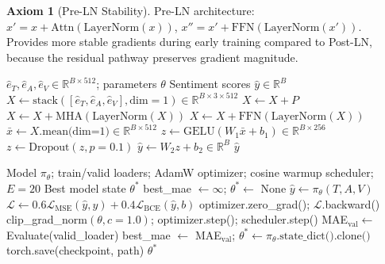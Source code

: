 \documentclass[12pt,a4paper]{article}
\theoremstyle{definition}
\newtheorem{axiom}{Axiom}[section]
\theoremstyle{plain}
\theoremstyle{remark}
\newcommand{\R}{\mathbb{R}}
\newcommand{\LN}{\mathrm{LayerNorm}}
\newcommand{\GELU}{\mathrm{GELU}}
\newcommand{\MHA}{\mathrm{MHA}}
\begin{document}
\begin{axiom}[Pre-LN Stability]
Pre-LN architecture: $x' = x + \text{Attn}(\LN(x))$, $x'' = x' + \text{FFN}(\LN(x'))$. Provides more stable gradients during early training compared to Post-LN, because the residual pathway preserves gradient magnitude.
\end{axiom}

\begin{algorithm}[H]
\caption{MultimodalFusionTransformer.forward}
\label{alg:fusion_forward}
\begin{algorithmic}[1]
\Require $\hat{e}_T, \hat{e}_A, \hat{e}_V \in \R^{B \times 512}$; parameters $\theta$
\Ensure Sentiment scores $\hat{y} \in \R^B$
\State $X \gets \text{stack}([\hat{e}_T, \hat{e}_A, \hat{e}_V], \text{dim}=1) \in \R^{B \times 3 \times 512}$
\State $X \gets X + P$ 
  \State $X \gets X + \MHA(\LN(X))$ 
  \State $X \gets X + \text{FFN}(\LN(X))$ 
\EndFor
\State $\bar{x} \gets X.\text{mean(dim=1)} \in \R^{B \times 512}$
\State $z \gets \GELU(W_1 \bar{x} + b_1) \in \R^{B \times 256}$
\State $z \gets \text{Dropout}(z, p=0.1)$
\State $\hat{y} \gets W_2 z + b_2 \in \R^B$
\State \Return $\hat{y}$
\end{algorithmic}
\end{algorithm}

\begin{algorithm}[H]
\caption{Full Training Loop --- Pipeline E (20 Epochs, Best-Model Tracking)}
\label{alg:training_e}
\begin{algorithmic}[1]
\Require Model $\pi_\theta$; train/valid loaders; AdamW optimizer; cosine warmup scheduler; $E=20$
\Ensure Best model state $\theta^*$
\State best\_mae $\gets \infty$; $\theta^* \gets$ None
    \State $\hat{y} \gets \pi_\theta(T, A, V)$
    \State $\mathcal{L} \gets 0.6\mathcal{L}_{\text{MSE}}(\hat{y},y) + 0.4\mathcal{L}_{\text{BCE}}(\hat{y},b)$
    \State optimizer.zero\_grad(); $\mathcal{L}$.backward()
    \State clip\_grad\_norm$(\theta, c=1.0)$; optimizer.step(); scheduler.step()
  \EndFor
  \State MAE$_\text{val} \gets$ Evaluate(valid\_loader)
    \State best\_mae $\gets$ MAE$_\text{val}$; $\theta^* \gets \pi_\theta.\text{state\_dict().clone()}$
  \EndIf
  \State torch.save(checkpoint, path)
\EndFor
\State \Return $\theta^*$ 
\end{algorithmic}
\end{algorithm}
\end{document}

